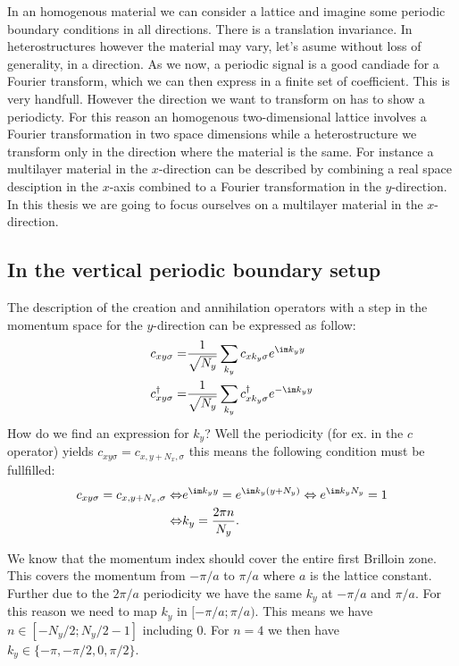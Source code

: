 \documentclass[../main.tex]{subfile}
\begin{document}
In an homogenous material we can consider a lattice and imagine some periodic boundary conditions in all directions. There is a translation invariance.
In heterostructures however the material may vary, let's asume
without loss of generality, in a direction. As we now, a periodic signal is a good candiade for a Fourier transform, which we can then express in a finite set of coefficient. This is very handfull.
However the direction we want to transform on has to show a periodicty. For this reason an homogenous two-dimensional lattice involves a Fourier transformation in two space dimensions while a heterostructure
we transform only in the direction where the material is the same. For instance a multilayer material in the $x$-direction can be described by combining a real space desciption in the $x$-axis 
combined to a Fourier transformation in the $y$-direction.
In this thesis we are going to focus ourselves on a multilayer material in the $x$-direction.\\

\subsection{In the vertical periodic boundary setup}
The description of the creation and annihilation operators with a step in the momentum space for the $y$-direction can be expressed as follow:
\begin{align}
    c_{xy\sigma} =& \frac{1}{\sqrt{N_y}} \sum_{k_y} c_{x k_y\sigma} e^{\im k_y y} \label{eq:C_Foruier}\\
    c^{\dagger}_{xy\sigma} =& \frac{1}{\sqrt{N_y}} \sum_{k_y} c^{\dagger}_{x k_y\sigma} e^{-\im k_y y}\label{eq:C_dagg_Foruier}
\end{align}
How do we find an expression for $k_y$? Well the periodicity (for ex. in the $c$ operator) yields 
$c_{xy\sigma} = c_{x,y+N_x,\sigma}$ this means the following condition must be fullfilled:
\begin{align*}
    c_{xy\sigma} = c_{x,y+N_x,\sigma} \Leftrightarrow &e^{\im k_y y} = e^{\im k_y (y+N_y)} \Leftrightarrow e^{\im k_y N_y} = 1\\
    \Leftrightarrow &k_y = \frac{2\pi n}{N_y}.
\end{align*}

We know that the momentum index should cover the entire first Brilloin zone. This covers the momentum from $-\pi/a$ to $\pi/a$ 
where $a$ is the lattice constant. Further due to the $2\pi/a$ periodicity we have the same $k_y$ at $-\pi/a$ and $\pi/a$.
For this reason we need to map $k_y $ in $[-\pi/a ;\pi/a)$.
This means we have $n\in \left[-N_y/2  ; N_y/2-1\right]$ including $0$. For $n=4$ we then have $k_y\in\{ -\pi, -\pi/2, 0,  \pi/2\}$. \\
\end{document}
